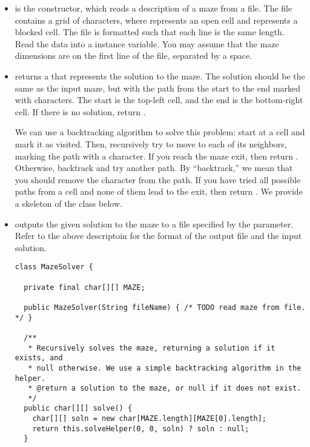 \begin{itemize}
    \item {} is the constructor, which reads a description of a maze from a file. The file contains a grid of characters, where  represents an open cell and  represents a blocked cell. The file is formatted such that each line is the same length. Read the data into a  instance variable. You may assume that the maze dimensions are on the first line of the file, separated by a space.

    \item {} returns a  that represents the solution to the maze. The solution should be the same as the input maze, but with the path from the start to the end marked with  characters. The start is the top-left cell, and the end is the bottom-right cell. If there is no solution, return .

    We can use a backtracking algorithm to solve this problem: start at a cell and mark it as visited. Then, recursively try to move to each of its neighbors, marking the path with a  character. If you reach the maze exit, then return . Otherwise, backtrack and try another path. By ``backtrack,'' we mean that you should remove the  character from the path. If you have tried all possible paths from a cell and none of them lead to the exit, then return . We provide a skeleton of the class below.

    \item {} outputs the given solution to the maze to a file specified by the parameter. Refer to the above descriptoin for the format of the output file and the input  solution.

\begin{cl}[]{}
\begin{lstlisting}[language=MyJava]
class MazeSolver {

  private final char[][] MAZE;

  public MazeSolver(String fileName) { /* TODO read maze from file. */ }

  /**
   * Recursively solves the maze, returning a solution if it exists, and 
   * null otherwise. We use a simple backtracking algorithm in the helper.
   * @return a solution to the maze, or null if it does not exist.
   */
  public char[][] solve() {
    char[][] soln = new char[MAZE.length][MAZE[0].length];
    return this.solveHelper(0, 0, soln) ? soln : null;
  }


\end{lstlisting}
\end{cl}
\end{itemize}
